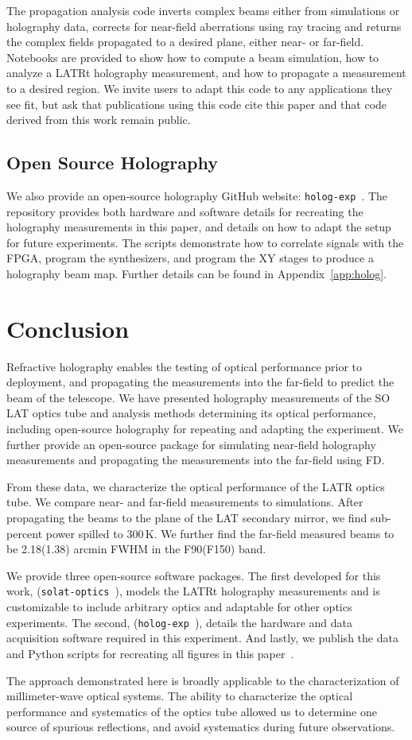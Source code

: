 The propagation analysis code inverts complex beams either from simulations or holography data, corrects for near-field aberrations using ray tracing and returns the complex fields propagated to a desired plane, either near- or far-field.   Notebooks are provided to show how to compute a beam simulation, how to analyze a LATRt holography measurement, and how to propagate a measurement to a desired region.  We invite users to adapt this code to any applications they see fit, but ask that publications using this code cite this paper and that code derived from this work remain public.

\subsection{Open Source Holography}
We also provide an open-source holography GitHub website:  \verb|holog-exp|~\cite{holog-exp}.  The repository provides both hardware and software details for recreating the holography measurements in this paper, and details on how to adapt the setup for future experiments.  The scripts demonstrate how to correlate signals with the FPGA, program the synthesizers, and program the XY stages to produce a holography beam map.  Further details can be found in Appendix~\ref{app:holog}.

\section{Conclusion}
\label{sec:discussion}
Refractive holography enables the testing of optical performance prior to deployment, and propagating the measurements into the far-field to predict the beam of the telescope.  We have presented holography measurements of the SO LAT optics tube and analysis methods determining its optical performance, including open-source holography for repeating and adapting the experiment.  We further provide an open-source package for simulating near-field holography measurements and propagating the measurements into the far-field using FD. 

From these data, we characterize the optical performance of the LATR optics tube.  We compare near- and far-field measurements to simulations.  After propagating the beams to the plane of the LAT secondary mirror, we find sub-percent power spilled to 300\,K.  We further find the far-field measured beams to be 2.18(1.38) arcmin FWHM in the F90(F150) band.

We provide three open-source software packages.  The first developed for this work, (\verb|solat-optics|~\cite{holog_sim_model}), models the LATRt holography measurements and is customizable to include arbitrary optics and adaptable for other optics experiments.  The second, (\verb|holog-exp|~\cite{holog-exp}), details the hardware and data acquisition software required in this experiment.  And lastly, we publish the data and Python scripts for recreating all figures in this paper~\cite{knowledge}.

The approach demonstrated here is broadly applicable to the characterization of millimeter-wave optical systems.  The ability to characterize the optical performance and systematics of the optics tube allowed us to determine one source of spurious reflections, and avoid systematics during future observations. 